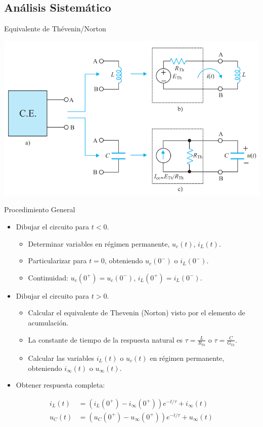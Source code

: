 \documentclass[aspectratio=169, usenames,svgnames,dvipsnames]{beamer}
\begin{document}
\subsection{Análisis Sistemático}
\label{sec:org80f04ac}

\begin{frame}[label={sec:org892afe0}]{Equivalente de Thévenin/Norton}
\begin{center}
\includegraphics[height=0.85\textheight]{../figs/Thevenin_PrimerOrden.pdf}
\end{center}
\end{frame}

\begin{frame}[label={sec:org053183c}]{Procedimiento General}
\begin{itemize}
\item Dibujar el circuito para \(t < 0\).
\begin{itemize}
\item Determinar variables en régimen permanente, \(u_c(t)\), \(i_L(t)\).
\item Particularizar para \(t = 0\), obteniendo \(u_c(0^-)\) o \(i_L(0^-)\).
\item Continuidad: \(u_c(0^+) = u_c(0^-)\), \(i_L(0^+) = i_L(0^-)\).
\end{itemize}
\item Dibujar el circuito para \(t > 0\).
\begin{itemize}
\item Calcular el equivalente de Thevenin (Norton) visto por el elemento de acumulación.
\item La constante de tiempo de la respuesta natural es \(\tau = \frac{L}{R_{th}}\) o \(\tau = \frac{C}{G_{th}}\).
\item Calcular las variables \(i_L(t)\) o \(u_c(t)\) en régimen permanente, obteniendo \(i_\infty(t)\) o \(u_\infty(t)\).
\end{itemize}
\item Obtener respuesta completa:
\end{itemize}
\begin{align*}
i_L(t) &= \left(i_L(0^+) - i_\infty(0^+)\right) e^{-t/\tau} + i_\infty(t)\\
u_C(t) &= \left(u_C(0^+) - u_\infty(0^+)\right) e^{-t/\tau} + u_\infty(t)\\
\end{align*}
\end{frame}
\end{document}
